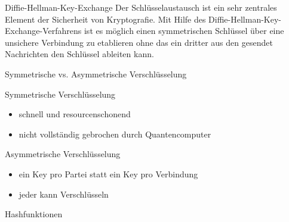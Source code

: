 \documentclass[10pt]{beamer}
\begin{document}
	\begin{frame}{Diffie-Hellman-Key-Exchange}
		Der Schlüsselaustausch ist ein sehr zentrales Element der Sicherheit von Kryptografie. Mit Hilfe des Diffie-Hellman-Key-Exchange-Verfahrens ist es möglich einen symmetrischen Schlüssel über eine unsichere Verbindung zu etablieren ohne das ein dritter aus den gesendet Nachrichten den Schlüssel ableiten kann.
	\end{frame}
	\begin{frame}{Symmetrische vs. Asymmetrische Verschlüsselung}
		\begin{alertblock}{Symmetrische Verschlüsselung}
			\begin{itemize}
				\item schnell und resourcenschonend
				\item nicht vollständig gebrochen durch Quantencomputer
			\end{itemize}
		\end{alertblock}
		\begin{alertblock}{Asymmetrische Verschlüsselung}
			\begin{itemize}
				\item ein Key pro Partei statt ein Key pro Verbindung
				\item jeder kann Verschlüsseln
			\end{itemize}
		\end{alertblock}
	\end{frame}

	\begin{frame}{Hashfunktionen}
	\end{frame}
\end{document}
